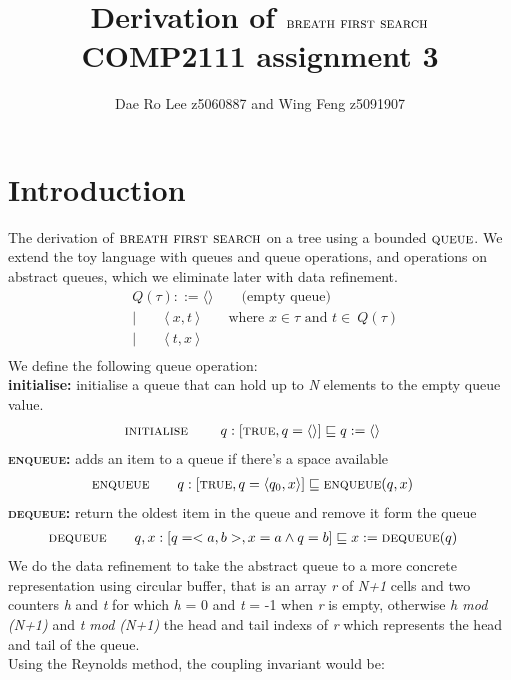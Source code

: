 \documentclass[headings=small,a4paper,12pt]{scrartcl}
\title{Derivation of $\bfs$\\
\large COMP2111 assignment 3}
\author{Dae Ro Lee z5060887 and Wing Feng z5091907}
\newcommand{\bfs}{\textsc{breath first search}\xspace}
\newcommand{\qu}{\textsc{queue}\xspace}
\newcommand{\enq}{\textsc{enqueue}\xspace}
\newcommand{\deq}{\textsc{dequeue}\xspace}
\newcommand{\ini}{\textsc{initialise}\xspace}
\begin{document}
\maketitle
%
\section{Introduction}
\label{sec:introduction}
The derivation of $\bfs$ on a tree using a bounded $\qu$. 
%
We extend the toy language with queues and queue operations, and operations on abstract queues, which we eliminate later with data refinement. 
\begin{align*}
    &Q(\tau) ::= \langle\rangle\qquad\text{(empty queue)}\\
    &|\qquad\langle~x,t~\rangle\qquad\text{where $x\in\tau$ and $t\in~Q(\tau)$}\\
    &|\qquad\langle~t,x~\rangle\\
\end{align*}
We define the following queue operation:\\
\textbf{initialise:} initialise a queue that can hold up to \textit{N} elements to the empty queue value.
\begin{align*}
  &\ini\qquad~q :[\True, q = \langle\rangle] \isrefinedby q\Ass \langle\rangle
\end{align*}
\textbf{\enq:} adds an item to a queue if there's a space available 
\begin{align*}
  &\enq\qquad q:[\True, q=\langle q_0,x\rangle]\isrefinedby \enq(q,x)
\end{align*}
\textbf{\deq:} return the oldest item in the queue and remove it form the queue\\
\begin{align*}
	&\deq\qquad q,x:[q = <a,b>, x = a \And q = b] \isrefinedby x \Ass \deq(q) 
\end{align*}
We do the data refinement to take the abstract queue to a more concrete representation using circular buffer, that is an array \textit{r} of  \textit{N+1} cells and two counters \textit{h} and \textit{t} for which \textit{h} = 0 and \textit{t} = -1 when \textit{r} is empty, otherwise \textit{h mod (N+1)} and \textit{t mod (N+1)}  the head and tail indexs of \textit{r} which represents the head and tail of the queue.\\
%
Using the Reynolds method, the coupling invariant would be:\\
\end{document}
